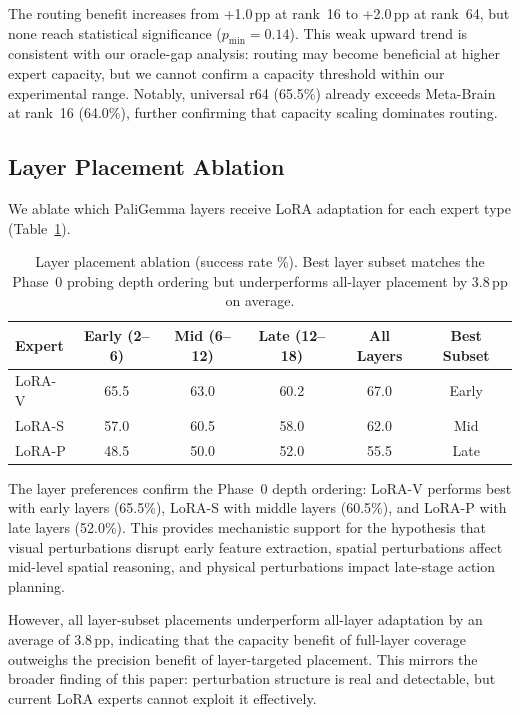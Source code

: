 \documentclass[letterpaper]{article}
\newcommand{\ours}{Meta-Brain}
\newcommand{\pp}{\,\text{pp}}
\begin{document}
The routing benefit increases from +1.0$\pp$ at rank~16 to +2.0$\pp$ at rank~64, but none reach statistical significance ($p_{\min} = 0.14$). This weak upward trend is consistent with our oracle-gap analysis: routing may become beneficial at higher expert capacity, but we cannot confirm a capacity threshold within our experimental range. Notably, universal r64 (65.5\%) already exceeds \ours{} at rank~16 (64.0\%), further confirming that capacity scaling dominates routing.

\subsection{Layer Placement Ablation}
\label{sec:layer_placement}

We ablate which PaliGemma layers receive LoRA adaptation for each expert type (Table~\ref{tab:layer_placement}).

\begin{table}[h]
\centering
\caption{Layer placement ablation (success rate \%). Best layer subset matches the Phase~0 probing depth ordering but underperforms all-layer placement by 3.8$\pp$ on average.}
\label{tab:layer_placement}
\small
\begin{tabular}{lccccc}
\toprule
\textbf{Expert} & \textbf{Early (2--6)} & \textbf{Mid (6--12)} & \textbf{Late (12--18)} & \textbf{All Layers} & \textbf{Best Subset} \\
\midrule
LoRA-V & 65.5 & 63.0 & 60.2 & 67.0 & Early \\
LoRA-S & 57.0 & 60.5 & 58.0 & 62.0 & Mid \\
LoRA-P & 48.5 & 50.0 & 52.0 & 55.5 & Late \\
\bottomrule
\end{tabular}
\end{table}

The layer preferences confirm the Phase~0 depth ordering: LoRA-V performs best with early layers (65.5\%), LoRA-S with middle layers (60.5\%), and LoRA-P with late layers (52.0\%). This provides mechanistic support for the hypothesis that visual perturbations disrupt early feature extraction, spatial perturbations affect mid-level spatial reasoning, and physical perturbations impact late-stage action planning.

However, all layer-subset placements underperform all-layer adaptation by an average of 3.8$\pp$, indicating that the capacity benefit of full-layer coverage outweighs the precision benefit of layer-targeted placement. This mirrors the broader finding of this paper: perturbation structure is real and detectable, but current LoRA experts cannot exploit it effectively.
\end{document}

